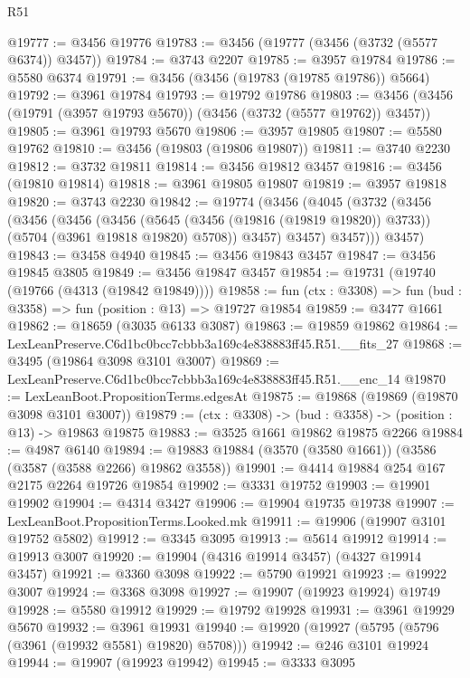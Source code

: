 \begin{lexlean}{R51}
\begin{coremodule}
@19777 := @3456 @19776
@19783 := @3456 (@19777 (@3456 (@3732 (@5577 @6374)) @3457))
@19784 := @3743 @2207
@19785 := @3957 @19784
@19786 := @5580 @6374
@19791 := @3456 (@3456 (@19783 (@19785 @19786)) @5664)
@19792 := @3961 @19784
@19793 := @19792 @19786
@19803 := @3456 (@3456 (@19791 (@3957 @19793 @5670)) (@3456 (@3732 (@5577 @19762)) @3457))
@19805 := @3961 @19793 @5670
@19806 := @3957 @19805
@19807 := @5580 @19762
@19810 := @3456 (@19803 (@19806 @19807))
@19811 := @3740 @2230
@19812 := @3732 @19811
@19814 := @3456 @19812 @3457
@19816 := @3456 (@19810 @19814)
@19818 := @3961 @19805 @19807
@19819 := @3957 @19818
@19820 := @3743 @2230
@19842 := @19774
    (@3456
      (@4045
        (@3732
          (@3456
            (@3456
              (@3456
                (@3456
                  (@5645 (@3456 (@19816 (@19819 @19820)) @3733))
                  (@5704 (@3961 @19818 @19820) @5708))
                @3457)
              @3457)
            @3457)))
      @3457)
@19843 := @3458 @4940
@19845 := @3456 @19843 @3457
@19847 := @3456 @19845 @3805
@19849 := @3456 @19847 @3457
@19854 := @19731 (@19740 (@19766 (@4313 (@19842 @19849))))
@19858 := fun (ctx : @3308) => fun (bud : @3358) => fun (position : @13) => @19727 @19854
@19859 := @3477 @1661
@19862 := @18659 (@3035 @6133 @3087)
@19863 := @19859 @19862
@19864 := LexLeanPreserve.C6d1bc0bcc7cbbb3a169c4e838883ff45.R51.__fits_27
@19868 := @3495 (@19864 @3098 @3101 @3007)
@19869 := LexLeanPreserve.C6d1bc0bcc7cbbb3a169c4e838883ff45.R51.__enc_14
@19870 := LexLeanBoot.PropositionTerms.edgesAt
@19875 := @19868 (@19869 (@19870 @3098 @3101 @3007))
@19879 := (ctx : @3308) -> (bud : @3358) -> (position : @13) -> @19863 @19875
@19883 := @3525 @1661 @19862 @19875 @2266
@19884 := @4987 @6140
@19894 := @19883 @19884 (@3570 (@3580 @1661)) (@3586 (@3587 (@3588 @2266) @19862 @3558))
@19901 := @4414 @19884 @254 @167 @2175 @2264 @19726 @19854
@19902 := @3331 @19752
@19903 := @19901 @19902
@19904 := @4314 @3427
@19906 := @19904 @19735 @19738
@19907 := LexLeanBoot.PropositionTerms.Looked.mk
@19911 := @19906 (@19907 @3101 @19752 @5802)
@19912 := @3345 @3095
@19913 := @5614 @19912
@19914 := @19913 @3007
@19920 := @19904 (@4316 @19914 @3457) (@4327 @19914 @3457)
@19921 := @3360 @3098
@19922 := @5790 @19921
@19923 := @19922 @3007
@19924 := @3368 @3098
@19927 := @19907 (@19923 @19924) @19749
@19928 := @5580 @19912
@19929 := @19792 @19928
@19931 := @3961 @19929 @5670
@19932 := @3961 @19931
@19940 := @19920 (@19927 (@5795 (@5796 (@3961 (@19932 @5581) @19820) @5708)))
@19942 := @246 @3101 @19924
@19944 := @19907 (@19923 @19942)
@19945 := @3333 @3095

\end{coremodule}
\end{lexlean}
